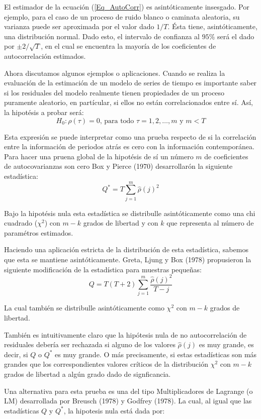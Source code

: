 \documentclass[
  a4paper,
]{article}
\begin{document}
El estimador de la ecuación (\ref{Eq_AutoCorr}) es asintóticamente
insesgado. Por ejemplo, para el caso de un proceso de ruido blanco o
caminata aleatoria, su varianza puede ser aproximada por el valor dado
\(1/T\). Ésta tiene, asintóticamente, una distribución normal. Dado
esto, el intervalo de confianza al \(95\%\) será el dado por
\(\pm 2/\sqrt{T}\), en el cual se encuentra la mayoría de los
coeficientes de autocorrelación estimados.

Ahora discutamos algunos ejemplos o aplicaciones. Cuando se realiza la
evaluación de la estimación de un modelo de series de tiempo es
importante saber si los residuales del modelo realmente tienen
propiedades de un proceso puramente aleatorio, en partícular, si ellos
no están correlacionados entre sí. Así, la hipotésis a probar será: \[
    H_0 : \rho(\tau) = 0 \mbox{, para todo } \tau = 1, 2, \ldots, m \mbox{ y } m < T
\]

Esta expresión se puede interpretar como una prueba respecto de si la
correlación entre la información de periodos atrás es cero con la
información contemporánea. Para hacer una pruena global de la hipotésis
de sí un número \(m\) de coeficientes de autocovarianzas son cero Box y
Pierce (1970) desarrollarón la siguiente estadística: \[
    Q^* = T \sum_{j = 1}^{m} \hat{\rho} (j)^2
\]

Bajo la hipotésis nula esta estadística se distribulle asintóticamente
como una chi cuadrado (\(\chi^2\)) con \(m-k\) grados de libertad y con
\(k\) que representa al número de paramétros estimados.

Haciendo una aplicación estricta de la distribución de esta estadística,
sabemos que esta se mantiene asintóticamente. Greta, Ljung y Box (1978)
propusieron la siguiente modificación de la estadística para muestras
pequeñas: \[
    Q = T(T + 2) \sum_{j = 1}^{m} \frac{\hat{\rho} (j)^2}{T - j}
\]

La cual también se distribulle asintóticamente como \(\chi^2\) con
\(m-k\) grados de libertad.

También es intuitivamente claro que la hipótesis nula de no
autocorrelación de residuales debería ser rechazada si alguno de los
valores \(\hat{\rho} (j)\) es muy grande, es decir, si \(Q\) o \(Q^*\)
es muy grande. O más precisamente, si estas estadísticas son más grandes
que los correspondientes valores críticos de la distribución \(\chi^2\)
con \(m-k\) grados de libertad a algún grado dado de signficancia.

Una alternativa para esta prueba es una del tipo Multiplicadores de
Lagrange (o LM) desarrollada por Breusch (1978) y Godfrey (1978). La
cual, al igual que las estadísticas \(Q\) y \(Q^*\), la hipotesis nula
está dada por:
\end{document}
